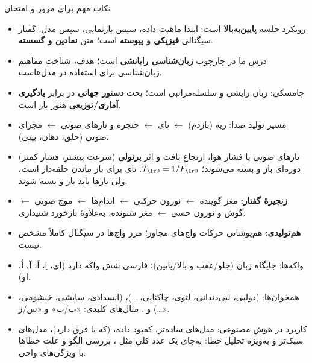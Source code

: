\begin{exambox}{نکات مهم برای مرور و امتحان}
\begin{itemize}
  \item رویکرد جلسه \textbf{پایین‌به‌بالا} است: ابتدا ماهیت داده، سپس بازنمایی، سپس مدل. گفتار سیگنالی \textbf{فیزیکی و پیوسته} است؛ متن \textbf{نمادین و گسسته}.
  \item درس ما در چارچوب \textbf{زبان‌شناسی رایانشی} است؛ هدف، شناخت مفاهیم زبان‌شناسی برای استفاده در مدل‌هاست.
  \item چامسکی: زبان زایشی و سلسله‌مراتبی است؛ بحث \textbf{دستور جهانی} در برابر \textbf{یادگیری آماری/توزیعی} هنوز باز است.
  \item مسیر تولید صدا: ریه (بازدم) $\leftarrow$ نای $\leftarrow$ حنجره و تارهای صوتی $\leftarrow$ مجرای صوتی (حلق، دهان، بینی).
  \item تارهای صوتی با فشار هوا، ارتجاع بافت و اثر \textbf{برنولی} (سرعت بیشتر، فشار کمتر) دوره‌ای باز و بسته می‌شوند؛ $\chtwoTz  = 1/\chtwoFz $. نای برای باز ماندن حلقه‌دار است، ولی تارها باید باز و بسته شوند.
  \item \textbf{زنجیرهٔ گفتار:} مغز گوینده $\leftarrow$ نورون حرکتی $\leftarrow$ اندام‌ها $\leftarrow$ موج صوتی $\leftarrow$ گوش و نورون حسی $\leftarrow$ مغز شنونده، به‌علاوهٔ بازخورد شنیداری.
  \item \textbf{هم‌تولیدی:} هم‌پوشانی حرکات واج‌های مجاور؛ مرز واج‌ها در سیگنال کاملاً مشخص نیست.
  \item واکه‌ها: جایگاه زبان (جلو/عقب و بالا/پایین)؛ فارسی شش واکه دارد (ای، اِ، اَ، آ، اُ، او).
  \item همخوان‌ها: \textbf{} (دولبی، لبی‌دندانی، لثوی، چاکنایی، \ldots)، \textbf{} (انسدادی، سایشی، خیشومی، \ldots) و \textbf{}. مثال‌های کلیدی: «ب/پ» و «س/ز».
  \item کاربرد در هوش مصنوعی: مدل‌های ساده‌تر، کمبود داده،  (که با  فرق دارد)، مدل‌های سبک‌تر و به‌ویژه تحلیل خطا: به‌جای یک عدد کلی مثل ، بررسی الگو و علت خطاها با ویژگی‌های واجی.
\end{itemize}
\end{exambox}

